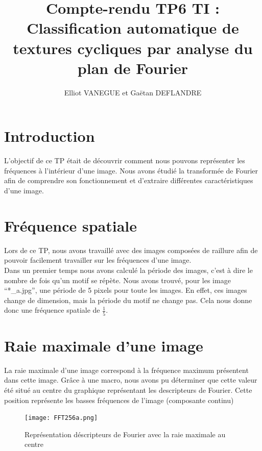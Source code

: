 \documentclass[a4paper,11pt]{article}
\title{Compte-rendu TP6 TI : Classification automatique de textures cycliques par analyse du plan de Fourier}
\author{Elliot VANEGUE et Gaëtan DEFLANDRE}
\begin{document}


  \maketitle
  
  \mbox{}
  \newpage
  \clearpage
  
  \section*{Introduction}
  L'objectif de ce TP était de découvrir comment nous pouvons représenter les fréquences à l'intérieur 
  d'une image. Nous avons étudié la transformée de Fourier afin de comprendre son fonctionnement et 
  d'extraire différentes caractéristiques d'une image.
  
  \section{Fréquence spatiale}
  Lors de ce TP, nous avons travaillé avec des images composées de raillure afin de pouvoir
  facilement travailler sur les fréquences d'une image.\\
  
  Dans un premier temps nous avons calculé la période des images, c'est à dire le nombre de fois 
  qu'un motif se répète. Nous avons trouvé, pour les image \enquote{*\_a.jpg}, une période de 5 pixels pour toute les images. En effet,
  ces images change de dimension, mais la période du motif ne change pas. Cela nous donne donc
  une fréquence spatiale de $\frac{1}{5}$.
  
  \section{Raie maximale d'une image}
  
  La raie maximale d'une image correspond à la fréquence maximum présentent dans cette image. Grâce à
  une macro, nous avons pu déterminer que cette valeur été situé au centre du graphique représentant
  les descripteurs de Fourier. Cette position représente les basses fréquences de l'image (composante continu)
  
  \begin{figure}[H]
  \center
   \texttt{[image: FFT256a.png]}
   \caption{Représentation déscripteurs de Fourier avec la raie maximale au centre}
  \end{figure}
\end{document}
